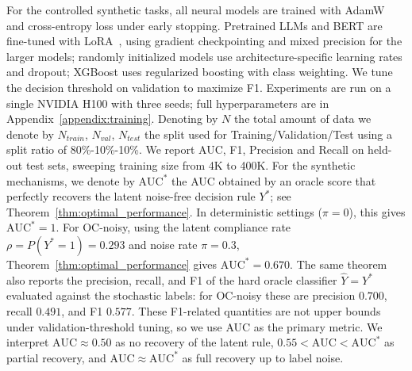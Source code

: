 \documentclass{article}
\theoremstyle{plain}
\theoremstyle{definition}
\theoremstyle{remark}
\begin{document}
For the controlled synthetic tasks, all neural models are trained with AdamW~\citep{AdamW} and cross-entropy loss under early stopping. Pretrained LLMs and BERT are fine-tuned with LoRA~\citep{LoRA}, using gradient checkpointing and mixed precision for the larger models; randomly initialized models use architecture-specific learning rates and dropout; XGBoost uses regularized boosting with class weighting. We tune the decision threshold on validation to maximize F1. Experiments are run on a single NVIDIA H100 with three seeds; full hyperparameters are in Appendix~\ref{appendix:training}. Denoting by $N$ the total amount of data we denote by $N_{train}$, $N_{val}$, $N_{test}$ the split used for Training/Validation/Test using a split ratio of 80\%-10\%-10\%. We report AUC, F1, Precision and Recall on held-out test sets, sweeping training size from 4K to 400K. For the synthetic mechanisms, we denote by $\mathrm{AUC}^*$ the AUC obtained by an oracle score that perfectly recovers the latent noise-free decision rule $Y^*$; see Theorem~\ref{thm:optimal_performance}. In deterministic settings ($\pi=0$), this gives $\mathrm{AUC}^*=1$. For OC-noisy, using the latent compliance rate $\rho = P(Y^*=1)=0.293$ and noise rate $\pi=0.3$, Theorem~\ref{thm:optimal_performance} gives $\mathrm{AUC}^*=0.670$. The same theorem also reports the precision, recall, and F1 of the hard oracle classifier $\hat Y=Y^*$ evaluated against the stochastic labels: for OC-noisy these are precision $0.700$, recall $0.491$, and F1 $0.577$. These F1-related quantities are not upper bounds under validation-threshold tuning, so we use AUC as the primary metric. We interpret $\mathrm{AUC}\approx 0.50$ as no recovery of the latent rule, $0.55<\mathrm{AUC}<\mathrm{AUC}^*$ as partial recovery, and
$\mathrm{AUC}\approx\mathrm{AUC}^*$ as full recovery up to label noise.
\end{document}
